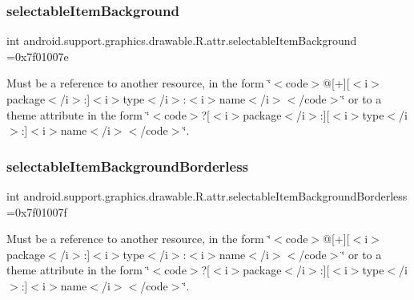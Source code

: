 \subsubsection{\texorpdfstring{selectable\+Item\+Background}{selectableItemBackground}}
{\footnotesize\ttfamily int android.\+support.\+graphics.\+drawable.\+R.\+attr.\+selectable\+Item\+Background =0x7f01007e\hspace{0.3cm}{\ttfamily [static]}}

Must be a reference to another resource, in the form \char`\"{}$<$code$>$@\mbox{[}+\mbox{]}\mbox{[}$<$i$>$package$<$/i$>$\+:\mbox{]}$<$i$>$type$<$/i$>$\+:$<$i$>$name$<$/i$>$$<$/code$>$\char`\"{} or to a theme attribute in the form \char`\"{}$<$code$>$?\mbox{[}$<$i$>$package$<$/i$>$\+:\mbox{]}\mbox{[}$<$i$>$type$<$/i$>$\+:\mbox{]}$<$i$>$name$<$/i$>$$<$/code$>$\char`\"{}. \mbox{\label{classandroid_1_1support_1_1graphics_1_1drawable_1_1R_1_1attr_a9eb0f075fffc9ddf38011fb7dca661bc}} 
\subsubsection{\texorpdfstring{selectable\+Item\+Background\+Borderless}{selectableItemBackgroundBorderless}}
{\footnotesize\ttfamily int android.\+support.\+graphics.\+drawable.\+R.\+attr.\+selectable\+Item\+Background\+Borderless =0x7f01007f\hspace{0.3cm}{\ttfamily [static]}}

Must be a reference to another resource, in the form \char`\"{}$<$code$>$@\mbox{[}+\mbox{]}\mbox{[}$<$i$>$package$<$/i$>$\+:\mbox{]}$<$i$>$type$<$/i$>$\+:$<$i$>$name$<$/i$>$$<$/code$>$\char`\"{} or to a theme attribute in the form \char`\"{}$<$code$>$?\mbox{[}$<$i$>$package$<$/i$>$\+:\mbox{]}\mbox{[}$<$i$>$type$<$/i$>$\+:\mbox{]}$<$i$>$name$<$/i$>$$<$/code$>$\char`\"{}. \mbox{\label{classandroid_1_1support_1_1graphics_1_1drawable_1_1R_1_1attr_adbc2e16f8d86de865cf504334096fcf7}} 
